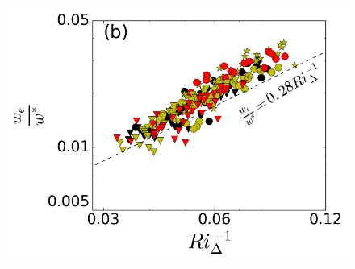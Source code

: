 \begin{figure}[htbp]
\begin{minipage}[b]{0.5\linewidth}
{                \includegraphics[scale=.3]{figures/scaledweinvri_Delta_f_GM}
}\\      
        \\      
       

\end{minipage}
\end{figure}
